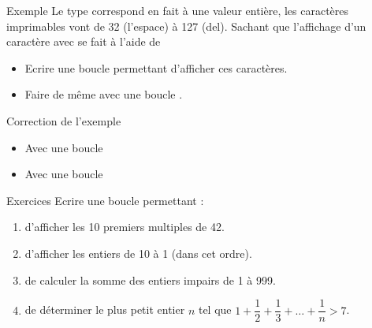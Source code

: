 \documentclass[10pt]{beamer}
\begin{document}
\begin{frame}[fragile]{\Ctitle}{\stitle}
	\begin{exampleblock}{Exemple}
		Le type  correspond en fait à une valeur entière, les caractères imprimables vont de 32 (l'espace) à 127 ({\sc del}). Sachant que l'affichage d'un caractère avec  se fait à l'aide de 
		\begin{itemize}
			\item<2-> Ecrire une boucle  permettant d'afficher ces caractères.
			\item<3-> Faire de même avec une boucle .
		\end{itemize}
	\end{exampleblock}
\end{frame}

\begin{frame}[fragile]{\Ctitle}{\stitle}
	\begin{exampleblock}{Correction de l'exemple}
		\begin{itemize}
			\item<1-> Avec une boucle  \\
			\item<2-> Avec une boucle  \\
		\end{itemize}
	\end{exampleblock}
\end{frame}

\begin{frame}[fragile]{\Ctitle}{\stitle}
	\begin{exampleblock}{Exercices}
	Ecrire une boucle permettant :
	\begin{enumerate}
		\item<1-> d'afficher les 10 premiers multiples de 42.
		\item<2-> d'afficher les entiers de 10 à 1 (dans cet ordre).
		\item<3-> de calculer la somme des entiers impairs de 1 à 999.
		\item<4-> de déterminer le plus petit entier $n$ tel que $1 + \dfrac{1}{2} + \dfrac{1}{3} + \dots +\dfrac{1}{n} > 7$.
	\end{enumerate}
	\end{exampleblock}
\end{frame}
\end{document}
